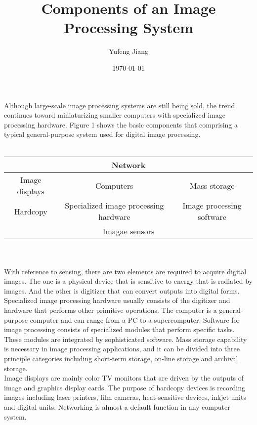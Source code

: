 \documentclass[11pt,oneside,a4paper]{article}
\title{Components of an Image Processing System}
\author{Yufeng Jiang}
\date{\today}
\begin{document}
\maketitle
Although large-scale image processing systems are still being sold, the trend continues toward miniaturizing smaller computers with specialized image processing hardware. Figure 1 shows the basic components that comprising a typical general-purpose system used for digital image processing.\\
\\
\begin{tabular}{|c|c|c|}
  \hline
  \multicolumn{3}{|c|}{Network}  \\ \hline
  Image displays & Computers & Mass storage \\ \hline
  Hardcopy & Specialized image processing hardware & Image processing software \\ \hline
  \multicolumn{3}{|c|}{Imagae sensors} \\ \hline
\end{tabular}
  \\
  \\
  \indent With reference to sensing, there are two elements are required to acquire digital images. The one is a physical device that is sensitive to energy that is radiated by images. And the other is digitizer that can convert outputs into digital forms. \\
\indent Specialized image processing hardware usually consists of the digitizer and hardware that performs other primitive operations. The computer is a general-purpose computer and can range from a PC to a supercomputer. Software for image processing consists of specialized modules that perform specific tasks. These modules are integrated by sophisticated software. Mass storage capability is necessary in image processing applications, and it can be divided into three principle categories including short-term storage, on-line storage and archival storage. \\
\indent Image displays are mainly color TV monitors that are driven by the outputs of image and graphics display cards. The purpose of hardcopy devices is recording images including laser printers, film cameras, heat-sensitive devices, inkjet units and digital units. Networking is almost a default function in any computer system.
\end{document}
